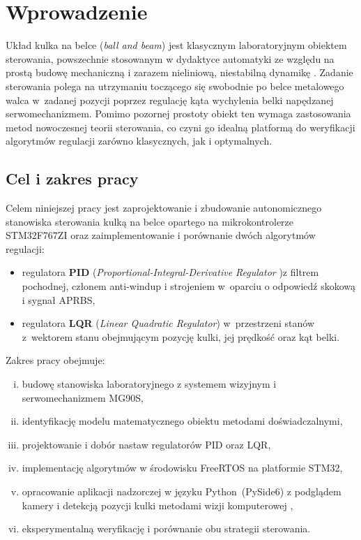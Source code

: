 
\chapter{Wprowadzenie}

Układ kulka na belce (\textit{ball and beam}) jest klasycznym laboratoryjnym obiektem sterowania,
powszechnie stosowanym w dydaktyce automatyki ze względu na prostą budowę mechaniczną
i zarazem nieliniową, niestabilną dynamikę \cite{bolivar2014modelling}.
Zadanie sterowania polega na utrzymaniu toczącego się swobodnie po belce metalowego walca
w~zadanej pozycji poprzez regulację kąta wychylenia belki napędzanej serwomechanizmem.
Pomimo pozornej prostoty obiekt ten wymaga zastosowania metod nowoczesnej teorii sterowania,
co czyni go idealną platformą do weryfikacji algorytmów regulacji zarówno klasycznych, jak i optymalnych.

\section{Cel i zakres pracy}

Celem niniejszej pracy jest zaprojektowanie i zbudowanie autonomicznego stanowiska
sterowania kulką na belce opartego na mikrokontrolerze STM32F767ZI \cite{stm32f767zi}
oraz zaimplementowanie i porównanie dwóch algorytmów regulacji:
\begin{itemize}
  \item regulatora \textbf{PID} (\textit{Proportional-Integral-Derivative Regulator} )z filtrem pochodnej, członem anti-windup i strojeniem
        w~oparciu o odpowiedź skokową i sygnał APRBS,
  \item regulatora \textbf{LQR} (\textit{Linear Quadratic Regulator}) w~przestrzeni stanów
        z~wektorem stanu obejmującym pozycję kulki, jej prędkość oraz kąt belki.
\end{itemize}

Zakres pracy obejmuje:
\begin{enumerate}[(i)]
      \item budowę stanowiska laboratoryjnego z systemem wizyjnym \cite{vl53l0x}
        i serwomechanizmem MG90S,
  \item identyfikację modelu matematycznego obiektu metodami doświadczalnymi,
  \item projektowanie i dobór nastaw regulatorów PID oraz LQR,
  \item implementację algorytmów w środowisku FreeRTOS na platformie STM32,
  \item opracowanie aplikacji nadzorczej w języku Python~(PySide6) z podglądem
        kamery i detekcją pozycji kulki metodami wizji komputerowej \cite{kadam2024object},
  \item eksperymentalną weryfikację i porównanie obu strategii sterowania.
\end{enumerate}

